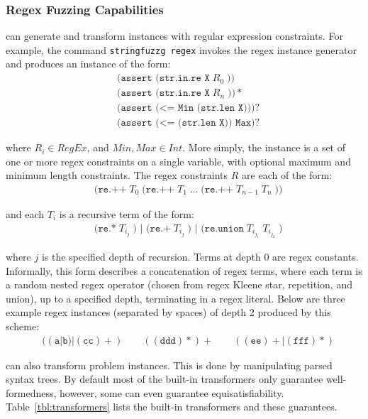 \subsubsection{Regex Fuzzing Capabilities}

\fuzzer{} can generate
and transform instances with regular expression constraints. For example, the
command \texttt{stringfuzzg regex} invokes the regex instance
generator and produces an instance of the form:
\begin{align*}
    & \texttt{(assert (str.in.re X}\; R_0\; \texttt{))} \\
    & \texttt{(assert (str.in.re X}\; R_n\; \texttt{))}* \\
    & \texttt{(assert (<= Min (str.len X)))}? \\
    & \texttt{(assert (<= (str.len X)) Max)}?
\end{align*}

where $R_i \in RegEx$, and $Min, Max \in Int$. More simply, the
instance is a set of one or more regex constraints on a single
variable, with optional maximum and minimum length constraints. The
regex constraints $R$ are each of the form:
\begin{align*}
    & \texttt{(re.++}\; T_0\; \texttt{(re.++}\; T_1\;
    \texttt{...}\; \texttt{(re.++}\; T_{n-1}\; T_n\; \texttt{))}
\end{align*}

and each $T_i$ is a recursive term of the form:
\begin{align*}
    & \texttt{(re.*}\; T_{i_j}\; \texttt{) | (re.+}\; T_{i_j}\;
    \texttt{) | (re.union}\; T_{i_{j_1}}\; T_{i_{j_2}}\; \texttt{)}
\end{align*}

where $j$ is the specified depth of recursion. Terms at depth 0 are
regex constants. Informally, this form describes a concatenation of
regex terms, where each term is a random nested regex operator (chosen from
regex Kleene star, repetition, and union), up to a specified depth,
terminating in a regex literal. Below are three example regex instances
(separated by spaces) of depth 2 produced by this scheme:
\begin{align*}
    & ((\texttt{a}|\texttt{b})|(\texttt{cc})+)\quad\quad
    ((\texttt{ddd})*)+\quad\quad ((\texttt{ee})+|(\texttt{fff})*)
\end{align*}

\fuzzer{} can also transform problem instances.
This is done by manipulating parsed syntax trees.
By default most of the built-in transformers 
only guarantee well-formedness, however,
some can even guarantee equisatisfiability. Table~\ref{tbl:transformers} 
lists the built-in transformers and these guarantees.

